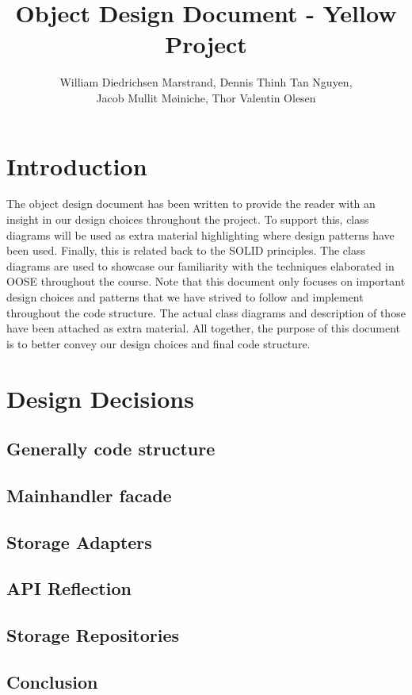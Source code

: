 \documentclass{article}
\title{Object Design Document - Yellow Project}
\author{William Diedrichsen Marstrand, Dennis Thinh Tan Nguyen, 
\\Jacob Mullit M{\o}iniche, Thor Valentin Olesen}
\begin{document}
\maketitle
\newpage
\tableofcontents
\newpage

\section{Introduction}

The object design document has been written to provide the reader with an insight in our design choices throughout the project. To support this, class diagrams will be used as extra material highlighting where design patterns have been used. Finally, this is related back to the SOLID principles. The class diagrams are used to showcase our familiarity with the techniques elaborated in OOSE throughout the course. Note that this document only focuses on important design choices and patterns that we have strived to follow and implement throughout the code structure. The actual class diagrams and description of those have been attached as extra material. All together, the purpose of this document is to better convey our design choices and final code structure. 



\section{Design Decisions}
	\subsection{Generally code structure}
		
	\subsection{Mainhandler facade}
		
	\subsection{Storage Adapters}
		
		\newpage
	\subsection{API Reflection}
		
		\newpage
	\subsection{Storage Repositories}
		
	\subsection{Conclusion}
		
	
\end{document}
